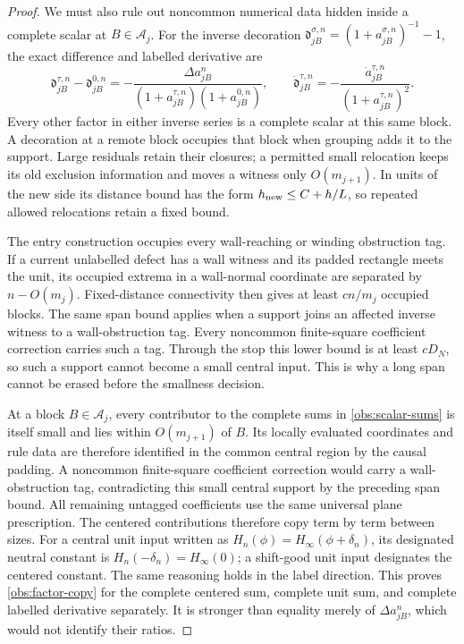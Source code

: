 \begin{proof}
We must also rule out noncommon numerical data hidden inside a
complete scalar at \(B\in\mathcal A_j\).  For the inverse decoration
\(\mathfrak d_{jB}^{\sigma,n}=(1+a_{jB}^{\sigma,n})^{-1}-1\), the
exact difference and labelled derivative are
\[
 \mathfrak d_{jB}^{\tau,n}-\mathfrak d_{jB}^{0,n}
   =-\frac{\Delta a_{jB}^n}
           {(1+a_{jB}^{\tau,n})(1+a_{jB}^{0,n})},
 \qquad
 \dot{\mathfrak d}_{jB}^{\tau,n}
   =-\frac{\dot a_{jB}^{\tau,n}}{(1+a_{jB}^{\tau,n})^2}.
\]
Every other factor in either inverse series is a complete scalar at
this same block.  A decoration at a remote block occupies that block
when grouping adds it to the support.  Large residuals retain their
closures; a permitted small relocation keeps its old exclusion
information and moves a witness only \(O(m_{j+1})\).  In units of
the new side its distance bound has the form
\(h_{\rm new}\le C+h/L\), so repeated allowed relocations retain a
fixed bound.

The entry construction occupies every wall-reaching or winding
obstruction tag.  If a current unlabelled defect has a wall witness
and its padded rectangle meets the unit, its occupied extrema in a
wall-normal coordinate are separated by \(n-O(m_j)\).  Fixed-distance
connectivity then gives at least \(c n/m_j\) occupied blocks.
The same span bound applies when a support joins an affected inverse
witness to a wall-obstruction tag.  Every noncommon finite-square
coefficient correction carries such a tag.  Through the stop this
lower bound is at least \(cD_N\), so
such a support cannot become a small central input.  This is why a
long span cannot be erased before the smallness decision.

At a block \(B\in\mathcal A_j\), every contributor to the complete
sums in \eqref{obs:scalar-sums} is itself small and lies within
\(O(m_{j+1})\) of \(B\).  Its locally evaluated coordinates and rule
data are therefore identified in the common central region by the causal padding.
A noncommon finite-square coefficient correction would carry a
wall-obstruction tag, contradicting this small central support by the
preceding span bound.  All remaining untagged coefficients use the
same universal plane prescription.  The centered contributions
therefore copy term by term between sizes.  For a central unit input
written as
\(H_n(\phi)=H_\infty(\phi+\delta_n)\), its designated neutral
constant is \(H_n(-\delta_n)=H_\infty(0)\); a shift-good unit input
designates the centered constant.  The same reasoning holds in the
label direction.  This proves \eqref{obs:factor-copy} for the
complete centered sum, complete unit sum, and complete labelled
derivative separately.  It is stronger than equality merely of
\(\Delta a_{jB}^n\), which would not identify their ratios.


\end{proof}
